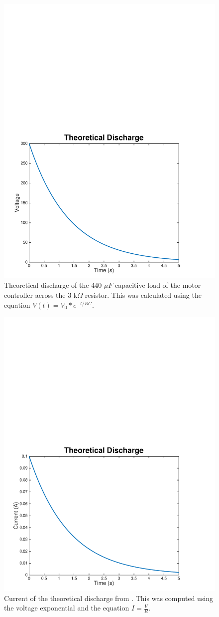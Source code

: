 \documentclass{article}
\begin{document}
\begin{figure}[H]
    \centering
    \includegraphics[width = 0.7 \textwidth]{discharge_voltage}
    \caption{Theoretical discharge of the 440 $\mu F$ capacitive load of the motor controller across the 3 k$\Omega$ resistor. This was calculated using the equation $V(t) = V_{0} * e^{-t/RC}$.}
    \label{fig:discharge_voltage}
\end{figure}

\begin{figure}[H]
    \centering
    \includegraphics[width = 0.7 \textwidth]{discharge_current}
    \caption{Current of the theoretical discharge from . This was computed using the voltage exponential and the equation $I = \frac{V}{R}$.}
    \label{fig:discharge_current}
\end{figure}
\end{document}
